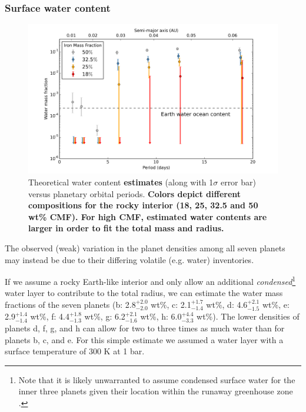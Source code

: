 \documentclass[twocolumn]{aastex63}
\begin{document}
\subsubsection{Surface water content} \label{sec:volatiles}

\begin{figure}
    \centering
    \includegraphics[width=\hsize]{figures/figure_water_period_TTV_trim.png}
    \oscaption{}%
    {Theoretical water content \textbf{estimates} (along with 1$\sigma$ error bar) versus planetary orbital periods. \textbf{Colors depict different compositions for the rocky interior
(18, 25, 32.5 and 50 wt\% CMF). For high CMF, estimated water contents are larger in order
to fit the total mass and radius.}}
    \label{fig:water_vs_period}
\end{figure}

The observed (weak) variation in the planet densities among all seven planets may instead be due to their differing volatile (e.g. water) inventories.

If we assume a rocky Earth-like interior and only allow an additional {\it condensed}\footnote{Note that it is likely unwarranted to assume condensed surface water for the inner three planets given their location within the runaway greenhouse zone \citep{Turbet2020}.} water layer to contribute to the total radius, we can estimate the water mass fractions of the seven planets (b: 2.8$^{+2.0}_{-2.0}$ wt\%, c: 2.1$^{+1.7}_{-1.4}$ wt\%, d: 4.6$^{+2.1}_{-1.5}$ wt\%, e: 2.9$^{+1.4}_{-1.4}$ wt\%, f: 4.4$^{+1.8}_{-1.3}$ wt\%, g: 6.2$^{+2.1}_{-1.6}$  wt\%, h: 6.0$^{+4.4}_{-3.3}$ wt\%).
The lower densities of planets d, f, g, and h can allow for two to three times as much water than for planets b, c, and e. For this simple estimate we assumed a water layer with a surface temperature of 300 K at 1 bar.
\end{document}
